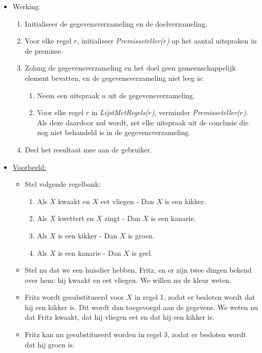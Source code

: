 \begin{itemize}
\begin{itemize}
\begin{itemize}
\begin{itemize}
			\end{itemize}
			\item Werking:
			\begin{enumerate}
				\item Initialiseer de gegevensverzameling en de doelverzameling.
				\item Voor elke regel $r$, initialiseer \textit{Premisseteller($r$)}
				 op het aantal uitspraken in de premisse.
				\item Zolang de gegevensverzameling en het doel geen gemeenschappelijk element bevatten, en de gegevensverzameling niet leeg is:
				\begin{enumerate}
					\item Neem een uitspraak $u$ uit de gegevensverzameling.
					\item Voor elke regel $r$ in \textit{LijstMetRegels($r$)}, verminder \textit{Premisseteller($r$)}. Als deze daardoor nul wordt, zet elke uitspraak uit de conclusie die nog niet behandeld is in de gegevensverzameling.
				\end{enumerate}
				\item Deel het resultaat mee aan de gebruiker.
			\end{enumerate}
			\item \underline{Voorbeeld:}
			\begin{itemize}
				\item Stel volgende regelbank:
				\begin{enumerate}
					\item Als $X$ kwaakt en $X$ eet vliegen - Dan $X$ is een kikker.
					\item Als $X$ kwettert en $X$ zingt - Dan $X$ is een kanarie.
					\item Als $X$ is een kikker - Dan $X$ is groen.
					\item Als $X$ is een kanarie - Dan $X$ is geel.
				\end{enumerate}
				\item Stel nu dat we een huisdier hebben, Fritz,  en er zijn twee dingen bekend over hem: hij kwaakt en eet vliegen. We willen nu de kleur weten.
				\item Fritz wordt gesubstitueerd voor $X$ in regel 1, zodat er besloten wordt dat hij een kikker is. Dit wordt dan toegevoegd aan de gegevens. We weten nu dat Fritz kwaakt, dat hij vliegen eet en dat hij een kikker is.
				\item Fritz kan nu gesubstitueerd worden in regel 3, zodat er besloten wordt dat hij groen is.
			\end{itemize}

\end{itemize}
\end{itemize}
\end{itemize}
